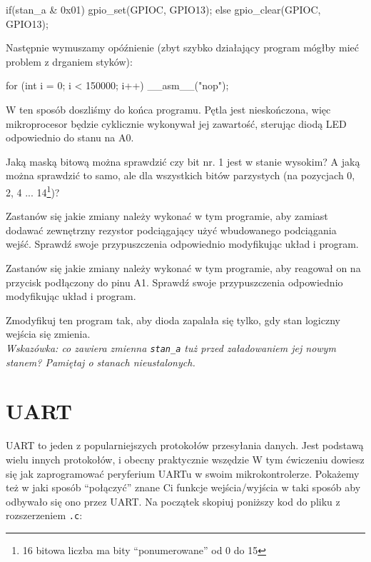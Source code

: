 \documentclass{pdfBooklets}
\begin{document}
\begin{CodeFrame*}[c]{}
    if(stan_a & 0x01){
      gpio_set(GPIOC, GPIO13);
    }else{
      gpio_clear(GPIOC, GPIO13);
    }
\end{CodeFrame*}

Następnie wymuszamy opóźnienie (zbyt szybko działający program mógłby mieć problem z drganiem styków):

\begin{CodeFrame*}[c]{}
    for (int i = 0; i < 150000; i++) __asm__("nop");
\end{CodeFrame*}

W ten sposób doszliśmy do końca programu. Pętla jest nieskończona, więc mikroprocesor będzie cyklicznie wykonywał
jej zawartość, sterując diodą LED odpowiednio do stanu na A0.


\begin{Zadanie}{}{}
  Jaką maską bitową można sprawdzić czy bit nr. 1 jest w stanie wysokim? A jaką można sprawdzić to samo, ale
  dla wszystkich bitów parzystych (na pozycjach 0, 2, 4 ... 14\footnote{16 bitowa liczba ma bity ``ponumerowane'' od 0 do 15})?
\end{Zadanie}

\begin{Zadanie}{}{}
  Zastanów się jakie zmiany należy wykonać w tym programie, aby zamiast dodawać zewnętrzny rezystor podciągający użyć wbudowanego podciągania wejść.
  Sprawdź swoje przypuszczenia odpowiednio modyfikując układ i program.
\end{Zadanie}

\begin{Zadanie}{}{}
  Zastanów się jakie zmiany należy wykonać w tym programie, aby reagował on na przycisk podłączony do pinu A1.
  Sprawdź swoje przypuszczenia odpowiednio modyfikując układ i program.
\end{Zadanie}

\begin{Zadanie}{}{}
  Zmodyfikuj ten program tak, aby dioda zapalała się tylko, gdy stan logiczny wejścia się zmienia.\\
  \textit{Wskazówka: co zawiera zmienna \texttt{\Verb$stan_a$} tuż przed załadowaniem jej nowym stanem? Pamiętaj
  o stanach nieustalonych.}
\end{Zadanie}



\section{UART}
UART to jeden z popularniejszych protokołów przesyłania danych. Jest podstawą wielu innych protokołów, i obecny praktycznie wszędzie
W tym ćwiczeniu dowiesz się jak zaprogramować peryferium UARTu w swoim mikrokontrolerze. Pokażemy też w jaki sposób ``połączyć'' znane Ci funkcje
wejścia/wyjścia w taki sposób aby odbywało się ono przez UART. Na początek skopiuj poniższy kod do pliku z rozszerzeniem \Verb$.c$:
\end{document}
